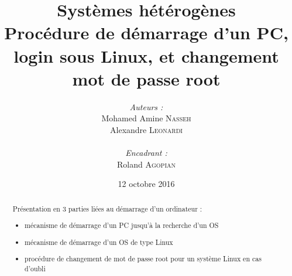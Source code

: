 \documentclass[a4paper,11pt]{article}
\title{
  \textbf{Systèmes hétérogènes}\\
  Procédure de démarrage d'un PC, login sous Linux, et changement mot de passe root
}
\author{
\begin{minipage}{0.4\textwidth}
	\begin{flushleft} \large
		\emph{Auteurs :}\\
                Mohamed Amine \textsc{Nasseh}\\
		Alexandre \textsc{Leonardi}\\
	\end{flushleft}
\end{minipage}
\begin{minipage}{0.4\textwidth}
	\begin{flushright} \large
		\emph{Encadrant :} \\
		Roland \textsc{Agopian}\\
	\end{flushright}
\end{minipage}
}
\date{12 octobre 2016}
\begin{document}
\maketitle
\thispagestyle{empty}
\begin{abstract}
Présentation en 3 parties liées au démarrage d'un ordinateur :
\begin{itemize}
	\item mécanisme de démarrage d'un PC jusqu'à la recherche d'un OS
    \item mécanisme de démarrage d'un OS de type Linux
    \item procédure de changement de mot de passe root pour un système Linux en cas d'oubli
\end{itemize}
\end{abstract}
\pagebreak

\tableofcontents
\pagebreak


\pagebreak

\pagebreak

\pagebreak

\pagebreak
\nocite{*}

\end{document}
